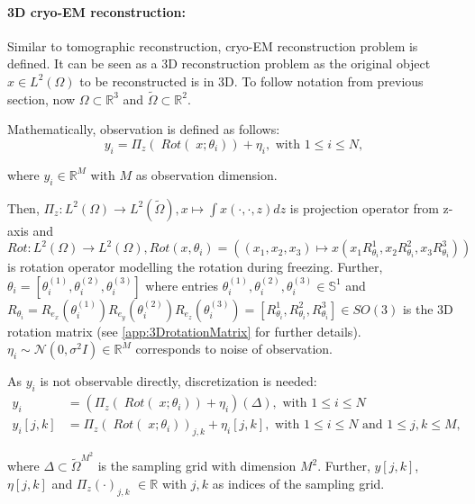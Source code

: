 \paragraph{3D cryo-EM reconstruction:}
Similar to tomographic reconstruction, cryo-EM reconstruction problem \cite{cryoEmMath} is defined.
It can be seen as a 3D reconstruction problem as the original object $x \in L^2(\Omega)$ to be reconstructed is in 3D.
To follow notation from previous section, now $\Omega \subset \mathbb{R}^3 $ and $\tilde{\Omega} \subset \mathbb{R}^2 $.

Mathematically, observation is defined as follows:
\begin{equation}
    \label{eq:cryoEmSimple}
    y_i = \Pi_z  (\; Rot (\;x; \theta_i )) + \eta_i, \text{ with } 1 \leq i \leq N,
\end{equation}

where $y_i \in \mathbb{R}^M$ with $M$ as observation dimension.

Then, $\Pi_z : L^2(\Omega) \to L^2(\tilde{\Omega}), x \mapsto  \int x(\cdot,\cdot,z) dz$ is projection operator from z-axis
and 
$Rot : L^2(\Omega) \to L^2(\Omega), Rot(x, \theta_i) = \left((x_1,x_2,x_3) \mapsto x( x_1R^1_{\theta_i}, x_2R^2_{\theta_i}, x_3R^3_{\theta_i})\right)$ is rotation operator modelling the rotation during freezing.
Further, $\theta_i = [\theta_i^{(1)}, \theta_i^{(2)}, \theta_i^{(3)} ] $ where entries $ \theta_i^{(1)}, \theta_i^{(2)}, \theta_i^{(3)} \in \mathbb{S}^1$ and 
$R_{\theta_i} =  R_{e_x} (\theta_i^{(1)}) R_{e_y} (\theta_i^{(2)}) R_{e_z} (\theta_i^{(3)}) = [R^1_{\theta_i}, R^2_{\theta_i}, R^3_{\theta_i}] \in SO(3)$ is the 3D rotation matrix 
(see \ref{app:3DrotationMatrix} for further details). 
$\eta_i \sim \mathcal{N}(0,\sigma^2I) \in \mathbb{R}^M$ corresponds to noise of observation.


As $y_i$ is not observable directly, discretization is needed:
\begin{equation}
    \label{eq:cryoEmSimpleDiscrete}
    \begin{aligned}
        y_i &= \left( \Pi_z (\; Rot (\;x; \theta_i)) + \eta_i\right)(\Delta), \text{ with } 1 \leq i \leq N \\
        y_i[j,k] &= \Pi_z (\; Rot(\;x; \theta_i))_{j,k} + \eta_i[j,k], \text{ with } 1 \leq i \leq N \text{ and } 1 \leq j,k \leq M,
    \end{aligned}
\end{equation}

where $\Delta \subset \tilde{\Omega}^{M^2}$ is the sampling grid with dimension $M^2$.
Further, $y[j,k]$, $\eta[j,k]$ and $\Pi_z(\cdot)_{j,k}$ $ \in \mathbb{R}$ with $j,k$ as indices of 
the sampling grid.



